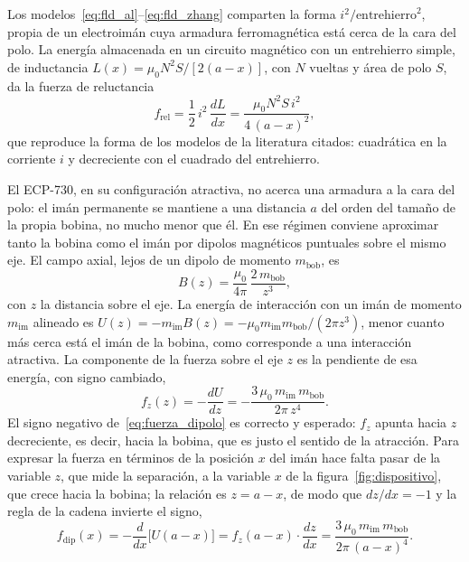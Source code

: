 Los modelos~\eqref{eq:fld_al}--\eqref{eq:fld_zhang} comparten la forma $i^2/\text{entrehierro}^2$, propia de un electroimán cuya armadura ferromagnética está cerca de la cara del polo. La energía almacenada en un circuito magnético con un entrehierro simple, de inductancia $L(x)=\mu_0 N^2 S/[2(a-x)]$, con $N$ vueltas y área de polo $S$, da la fuerza de reluctancia
\begin{equation}
f_{\text{rel}} = \frac{1}{2}\,i^2\,\frac{dL}{dx} = \frac{\mu_0 N^2 S\, i^2}{4\,(a-x)^2} ,
\label{eq:fld_reluctancia}
\end{equation}
que reproduce la forma de los modelos de la literatura citados: cuadrática en la corriente $i$ y decreciente con el cuadrado del entrehierro.

El ECP-730, en su configuración atractiva, no acerca una armadura a la cara del polo: el imán permanente se mantiene a una distancia $a$ del orden del tamaño de la propia bobina, no mucho menor que él. En ese régimen conviene aproximar tanto la bobina como el imán por dipolos magnéticos puntuales sobre el mismo eje. El campo axial, lejos de un dipolo de momento $m_{\text{bob}}$, es
\begin{equation}
B(z) = \frac{\mu_0}{4\pi}\,\frac{2\,m_{\text{bob}}}{z^3} ,
\label{eq:campo_dipolo}
\end{equation}
con $z$ la distancia sobre el eje. La energía de interacción con un imán de momento $m_{\text{im}}$ alineado es $U(z)=-m_{\text{im}}B(z)=-\mu_0 m_{\text{im}} m_{\text{bob}}/(2\pi z^3)$, menor cuanto más cerca está el imán de la bobina, como corresponde a una interacción atractiva. La componente de la fuerza sobre el eje $z$ es la pendiente de esa energía, con signo cambiado,
\begin{equation}
f_z(z) = -\frac{dU}{dz} = -\frac{3\,\mu_0\, m_{\text{im}}\, m_{\text{bob}}}{2\pi\, z^4} .
\label{eq:fuerza_dipolo}
\end{equation}
El signo negativo de~\eqref{eq:fuerza_dipolo} es correcto y esperado: $f_z$ apunta hacia $z$ decreciente, es decir, hacia la bobina, que es justo el sentido de la atracción. Para expresar la fuerza en términos de la posición $x$ del imán hace falta pasar de la variable $z$, que mide la separación, a la variable $x$ de la figura~\ref{fig:dispositivo}, que crece hacia la bobina; la relación es $z=a-x$, de modo que $dz/dx=-1$ y la regla de la cadena invierte el signo,
\begin{equation}
f_{\text{dip}}(x) = -\frac{d}{dx}\big[U(a-x)\big] = f_z(a-x)\cdot\frac{dz}{dx} = \frac{3\,\mu_0\, m_{\text{im}}\, m_{\text{bob}}}{2\pi\, (a-x)^4} .
\label{eq:fuerza_dipolo_x}
\end{equation}
